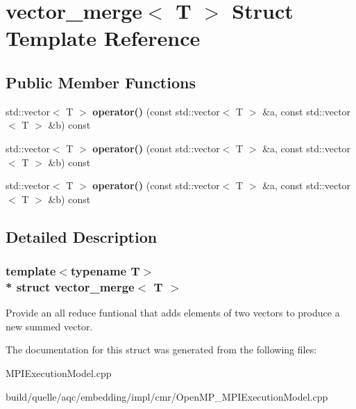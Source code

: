 \hypertarget{a00129}{}\section{vector\+\_\+merge$<$ T $>$ Struct Template Reference}
\label{a00129}
\subsection*{Public Member Functions}
\begin{DoxyCompactItemize}
\item 
std\+::vector$<$ T $>$ {\bfseries operator()} (const std\+::vector$<$ T $>$ \&a, const std\+::vector$<$ T $>$ \&b) const \hypertarget{a00129_add126c9cc0bc4348cb95346e752f130a}{}\label{a00129_add126c9cc0bc4348cb95346e752f130a}

\item 
std\+::vector$<$ T $>$ {\bfseries operator()} (const std\+::vector$<$ T $>$ \&a, const std\+::vector$<$ T $>$ \&b) const \hypertarget{a00129_add126c9cc0bc4348cb95346e752f130a}{}\label{a00129_add126c9cc0bc4348cb95346e752f130a}

\item 
std\+::vector$<$ T $>$ {\bfseries operator()} (const std\+::vector$<$ T $>$ \&a, const std\+::vector$<$ T $>$ \&b) const \hypertarget{a00129_add126c9cc0bc4348cb95346e752f130a}{}\label{a00129_add126c9cc0bc4348cb95346e752f130a}

\end{DoxyCompactItemize}


\subsection{Detailed Description}
\subsubsection*{template$<$typename T$>$\\*
struct vector\+\_\+merge$<$ T $>$}

Provide an all reduce funtional that adds elements of two vectors to produce a new summed vector. 

The documentation for this struct was generated from the following files\+:\begin{DoxyCompactItemize}
\item 
M\+P\+I\+Execution\+Model.\+cpp\item 
build/quelle/aqc/embedding/impl/cmr/\+Open\+M\+P\+\_\+\+M\+P\+I\+Execution\+Model.\+cpp\end{DoxyCompactItemize}
